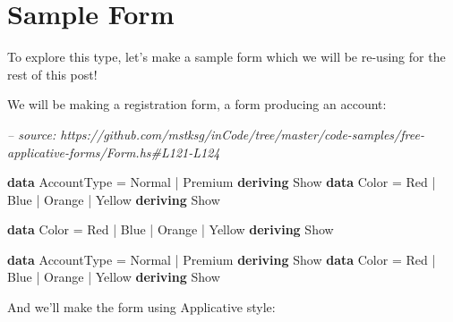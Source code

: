 \documentclass[]{article}
\newenvironment{Shaded}{}{}
\newcommand{\CommentTok}[1]{\textcolor[rgb]{0.38,0.63,0.69}{\textit{#1}}}
\newcommand{\DataTypeTok}[1]{\textcolor[rgb]{0.56,0.13,0.00}{#1}}
\newcommand{\FunctionTok}[1]{\textcolor[rgb]{0.02,0.16,0.49}{#1}}
\newcommand{\KeywordTok}[1]{\textcolor[rgb]{0.00,0.44,0.13}{\textbf{#1}}}
\begin{document}
\hypertarget{sample-form}{%
\section{Sample Form}\label{sample-form}}

To explore this type, let's make a sample form which we will be re-using for the
rest of this post!

We will be making a registration form, a form producing an account:

\begin{Shaded}
\begin{Highlighting}[]
\CommentTok{-- source: https://github.com/mstksg/inCode/tree/master/code-samples/free-applicative-forms/Form.hs#L121-L124}

\KeywordTok{data} \DataTypeTok{AccountType} \FunctionTok{=} \DataTypeTok{Normal} \FunctionTok{|} \DataTypeTok{Premium}
    \KeywordTok{deriving} \DataTypeTok{Show}
\KeywordTok{data} \DataTypeTok{Color} \FunctionTok{=} \DataTypeTok{Red} \FunctionTok{|} \DataTypeTok{Blue} \FunctionTok{|} \DataTypeTok{Orange} \FunctionTok{|} \DataTypeTok{Yellow}
    \KeywordTok{deriving} \DataTypeTok{Show}

\KeywordTok{data} \DataTypeTok{Color} \FunctionTok{=} \DataTypeTok{Red} \FunctionTok{|} \DataTypeTok{Blue} \FunctionTok{|} \DataTypeTok{Orange} \FunctionTok{|} \DataTypeTok{Yellow}
    \KeywordTok{deriving} \DataTypeTok{Show}

\KeywordTok{data} \DataTypeTok{AccountType} \FunctionTok{=} \DataTypeTok{Normal} \FunctionTok{|} \DataTypeTok{Premium}
    \KeywordTok{deriving} \DataTypeTok{Show}
\KeywordTok{data} \DataTypeTok{Color} \FunctionTok{=} \DataTypeTok{Red} \FunctionTok{|} \DataTypeTok{Blue} \FunctionTok{|} \DataTypeTok{Orange} \FunctionTok{|} \DataTypeTok{Yellow}
    \KeywordTok{deriving} \DataTypeTok{Show}
\end{Highlighting}
\end{Shaded}

And we'll make the form using Applicative style:
\end{document}
